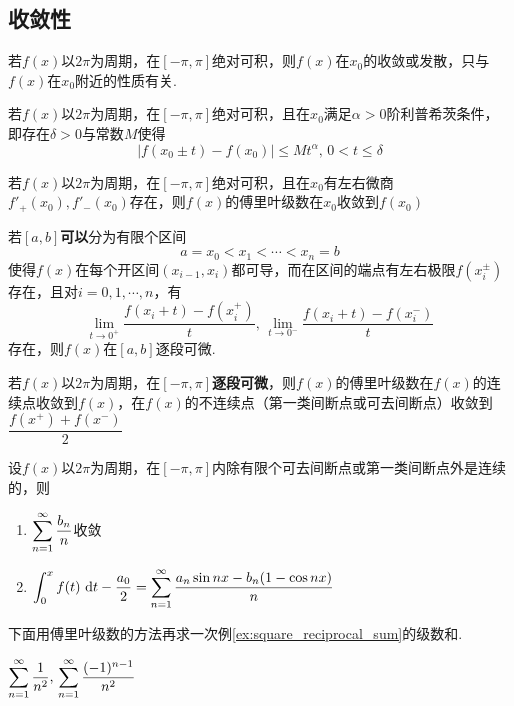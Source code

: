\subsection{收敛性}
\begin{theorem}[黎曼局部化定理]
若$f(x)$以$2\pi$为周期，在$[-\pi,\pi]$绝对可积，则$f(x)$在$x_0$的收敛或发散，只与$f(x)$在$x_0$附近的性质有关.
\end{theorem}
\begin{theorem}
若$f(x)$以$2\pi$为周期，在$[-\pi,\pi]$绝对可积，且在$x_0$满足$\alpha>0$阶利普希茨条件，即存在$\delta>0$与常数$M$使得
\[|f(x_0\pm t)-f(x_0)|\leq Mt^\alpha,\,0<t\leq\delta\]
\end{theorem}
\begin{corollary2}
若$f(x)$以$2\pi$为周期，在$[-\pi,\pi]$绝对可积，且在$x_0$有左右微商$f'_+(x_0),f'_-(x_0)$存在，则$f(x)$的傅里叶级数在$x_0$收敛到$f(x_0)$
\end{corollary2}
\begin{definition}[逐段可微]
若$[a,b]$\textbf{可以}分为有限个区间
\[a=x_0<x_1<\cdots<x_n=b\]
使得$f(x)$在每个开区间$(x_{i-1},x_i)$都可导，而在区间的端点有左右极限$f(x_i^\pm)$存在，且对$i=0,1,\cdots,n$，有
\[\lim_{t\to 0^+}\dfrac{f(x_i+t)-f(x_i^+)}{t},\,\lim_{t\to 0^-}\dfrac{f(x_i+t)-f(x_i^-)}{t}\]
存在，则$f(x)$在$[a,b]$逐段可微.
\end{definition}
\begin{theorem}[收敛的充分条件]
若$f(x)$以$2\pi$为周期，在$[-\pi,\pi]$\textbf{逐段可微}，则$f(x)$的傅里叶级数在$f(x)$的连续点收敛到$f(x)$，在$f(x)$的不连续点（第一类间断点或可去间断点）收敛到$\dfrac{f(x^+)+f(x^-)}{2}$
\end{theorem}
\begin{theorem}[逐项积分定理]
设$f(x)$以$2\pi$为周期，在$[-\pi,\pi]$内除有限个可去间断点或第一类间断点外是连续的，则
\begin{enumerate}
	\itemsep -2pt
	\item $\displaystyle\sum_{n=1}^{\infty}\dfrac{b_n}{n}$收敛
	\item $\displaystyle\displaystyle\int_{0}^{x}{f(t)}\,\,\mathrm{d} t-\dfrac{a_0}{2}=\displaystyle\sum_{n=1}^{\infty}\dfrac{a_n\sin nx-b_n(1-\cos nx)}{n}$
\end{enumerate}
\end{theorem}
\par 下面用傅里叶级数的方法再求一次例\ref{ex:square_reciprocal_sum}的级数和.
\begin{example}
\label{ex:square_reciprocal_sum2}
$\displaystyle\sum_{n=1}^{\infty}\dfrac{1}{n^2},\,\displaystyle\sum_{n=1}^{\infty}\dfrac{(-1)^{n-1}}{n^2}$
\end{example}
